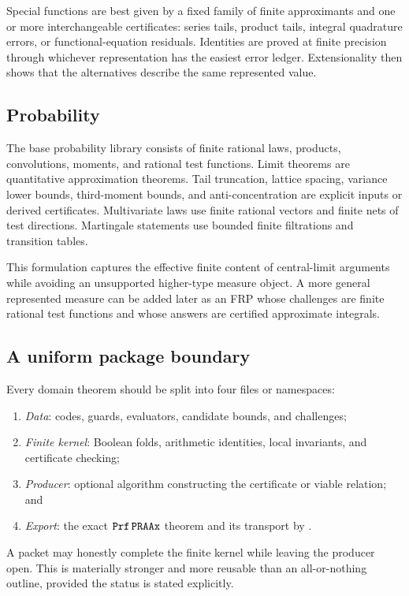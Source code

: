Special functions are best given by a fixed family of finite approximants and
one or more interchangeable certificates: series tails, product tails,
integral quadrature errors, or functional-equation residuals.  Identities are
proved at finite precision through whichever representation has the easiest
error ledger.  Extensionality then shows that the alternatives describe the
same represented value.

\subsection{Probability}

The base probability library consists of finite rational laws, products,
convolutions, moments, and rational test functions.  Limit theorems are
quantitative approximation theorems.  Tail truncation, lattice spacing,
variance lower bounds, third-moment bounds, and anti-concentration are explicit
inputs or derived certificates.  Multivariate laws use finite rational vectors
and finite nets of test directions.  Martingale statements use bounded finite
filtrations and transition tables.

This formulation captures the effective finite content of central-limit
arguments while avoiding an unsupported higher-type measure object.  A more
general represented measure can be added later as an FRP whose challenges are
finite rational test functions and whose answers are certified approximate
integrals.

\subsection{A uniform package boundary}

Every domain theorem should be split into four files or namespaces:

\begin{enumerate}
\item \emph{Data}: codes, guards, evaluators, candidate bounds, and challenges;
\item \emph{Finite kernel}: Boolean folds, arithmetic identities, local
      invariants, and certificate checking;
\item \emph{Producer}: optional algorithm constructing the certificate or
      viable relation; and
\item \emph{Export}: the exact \(\texttt{Prf}\,\texttt{PRAAx}\) theorem and its transport by
      .
\end{enumerate}

A packet may honestly complete the finite kernel while leaving the producer
open.  This is materially stronger and more reusable than an all-or-nothing
outline, provided the status is stated explicitly.
